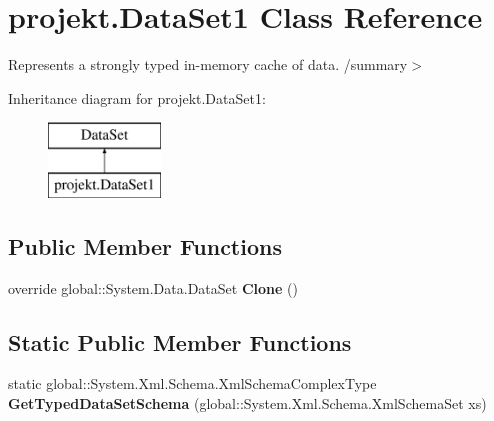 \hypertarget{classprojekt_1_1_data_set1}{}\section{projekt.\+Data\+Set1 Class Reference}
\label{classprojekt_1_1_data_set1}


Represents a strongly typed in-\/memory cache of data. /summary$>$  


Inheritance diagram for projekt.\+Data\+Set1\+:\begin{figure}[H]
\begin{center}
\leavevmode
\includegraphics[height=2.000000cm]{classprojekt_1_1_data_set1}
\end{center}
\end{figure}
\subsection*{Public Member Functions}
\begin{DoxyCompactItemize}
\item 
\mbox{\label{classprojekt_1_1_data_set1_a26f9dfcb33b30d3fc701574725273fd6}} 
override global\+::\+System.\+Data.\+Data\+Set {\bfseries Clone} ()
\end{DoxyCompactItemize}
\subsection*{Static Public Member Functions}
\begin{DoxyCompactItemize}
\item 
\mbox{\label{classprojekt_1_1_data_set1_af75a036bac30217b6582f66785499005}} 
static global\+::\+System.\+Xml.\+Schema.\+Xml\+Schema\+Complex\+Type {\bfseries Get\+Typed\+Data\+Set\+Schema} (global\+::\+System.\+Xml.\+Schema.\+Xml\+Schema\+Set xs)
\end{DoxyCompactItemize}
